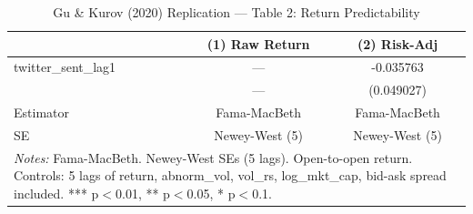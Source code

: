 \begin{table}[htbp]
\centering
\caption{Gu \& Kurov (2020) Replication --- Table 2: Return Predictability}
\label{tab:gk_t2}
\begin{tabular}{lcc}
\hline\hline
 & (1) Raw Return & (2) Risk-Adj \\
\hline
twitter\_sent\_lag1 & --- & -0.035763 \\
& --- & (0.049027) \\
\hline
Estimator & Fama-MacBeth & Fama-MacBeth \\
SE & Newey-West (5) & Newey-West (5) \\
\hline\hline
\multicolumn{3}{l}{\footnotesize \textit{Notes:} Fama-MacBeth. Newey-West SEs (5 lags). Open-to-open return. Controls: 5 lags of return, abnorm\_vol, vol\_rs, log\_mkt\_cap, bid-ask spread included. *** p$<$0.01, ** p$<$0.05, * p$<$0.1.} \\
\end{tabular}
\end{table}